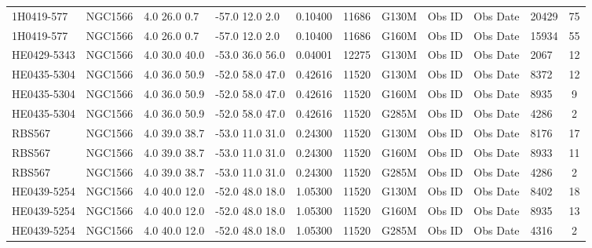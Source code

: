\documentclass[iop]{emulateapj-rtx4}
\begin{document}
\begin{table}[ht]
\begin{center}
\begin{tabular}{l l l l l l l l l l c}
1H0419-577  				&      NGC1566  	&       4.0  26.0  0.7  &     -57.0  12.0  2.0  &    0.10400  & 11686  &   G130M  &   Obs ID  & Obs Date  & 20429  &      75         \\
1H0419-577  				&      NGC1566  	&       4.0  26.0  0.7  &     -57.0  12.0  2.0  &    0.10400  & 11686  &   G160M  &   Obs ID  & Obs Date  & 15934  &      55         \\
HE0429-5343  				&      NGC1566  	&       4.0  30.0  40.0  &    -53.0  36.0  56.0  &   0.04001  & 12275  &   G130M  &   Obs ID  & Obs Date  & 2067  &       12         \\
HE0435-5304  				&      NGC1566  	&       4.0  36.0  50.9  &    -52.0  58.0  47.0  &   0.42616  & 11520  &   G130M  &   Obs ID  & Obs Date  & 8372  &       12         \\
HE0435-5304  				&      NGC1566  	&       4.0  36.0  50.9  &    -52.0  58.0  47.0  &   0.42616  & 11520  &   G160M  &   Obs ID  & Obs Date  & 8935  &       9           \\
HE0435-5304  				&      NGC1566  	&       4.0  36.0  50.9  &    -52.0  58.0  47.0  &   0.42616  & 11520  &   G285M  &   Obs ID  & Obs Date  & 4286  &       2           \\
RBS567  					&      NGC1566  	&       4.0  39.0  38.7  &    -53.0  11.0  31.0  &   0.24300  & 11520  &   G130M  &   Obs ID  & Obs Date  & 8176  &       17         \\
RBS567  					&      NGC1566  	&       4.0  39.0  38.7  &    -53.0  11.0  31.0  &   0.24300  & 11520  &   G160M  &   Obs ID  & Obs Date  & 8933  &       11         \\
RBS567  					&      NGC1566  	&       4.0  39.0  38.7  &    -53.0  11.0  31.0  &   0.24300  & 11520  &   G285M  &   Obs ID  & Obs Date  & 4286  &       2           \\
HE0439-5254  				&      NGC1566  	&       4.0  40.0  12.0  &    -52.0  48.0  18.0  &   1.05300  & 11520  &   G130M  &   Obs ID  & Obs Date  & 8402  &       18         \\
HE0439-5254				&      NGC1566  	&       4.0  40.0  12.0  &    -52.0  48.0  18.0  &   1.05300  & 11520  &   G160M  &   Obs ID  & Obs Date  & 8935  &       13         \\
HE0439-5254 				&      NGC1566  	&       4.0  40.0  12.0  &    -52.0  48.0  18.0  &   1.05300  & 11520  &   G285M  &   Obs ID  & Obs Date  & 4316  &       2           \\

\end{tabular}
\end{center}
\end{table}
\end{document}
